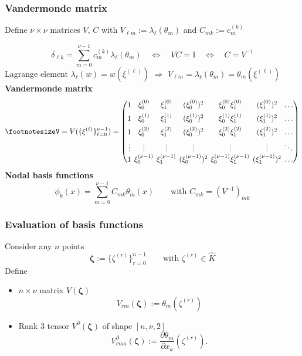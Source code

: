 \documentclass{beamer}
\begin{document}

\begin{frame}
\frametitle{Vandermonde matrix}

Define $\nu\times\nu$ matrices $V$, $C$ with $V_{\ell m} := \lambda_\ell(\theta_m)$ and $C_{mk}:=c_m^{(k)}$

$$
\delta_{\ell k} =  \sum_{m=0}^{\nu-1} c_m^{(k)} \lambda_\ell(\theta_m)
\quad \Leftrightarrow \quad
VC = \mathbb{I}\quad \Leftrightarrow \quad C = V^{-1}
$$
Lagrange element $\lambda_\ell(w) = w(\xi^{(\ell)})$ $\Rightarrow$ $V_{\ell m} = \lambda_{\ell}(\theta_m) = \theta_m(\xi^{(\ell)})$\\[1ex]
\textbf{Vandermonde matrix}
$$
\setlength\arraycolsep{2pt}
{\footnotesize%
V = V(\{\xi^{(\ell)}\}_{\ell=0}^{\nu-1}) = \begin{pmatrix}
1 & \xi^{(0)}_0 & \xi^{(0)}_1  & (\xi^{(0)}_0)^2 & \xi^{(0)}_0 \xi^{(0)}_1 & (\xi^{(0)}_1)^2 & \dots \\[1ex]
1 & \xi^{(1)}_0 & \xi^{(1)}_1 & (\xi^{(1)}_0)^2 & \xi^{(1)}_0 \xi^{(1)}_1 & (\xi^{(1)}_1)^2 & \dots \\[1ex]
1 & \xi^{(2)}_0 & \xi^{(2)}_1 & (\xi^{(2)}_0)^2 & \xi^{(2)}_0 \xi^{(2)}_1 & (\xi^{(2)}_1)^2 & \dots \\[1ex]
\vdots & \vdots & \vdots & \vdots & \vdots & \vdots & \ddots\\
1 & \xi^{(\nu-1)}_0 & \xi^{(\nu-1)}_1 & (\xi^{(\nu-1)}_0)^2 & \xi^{(\nu-1)}_0 \xi^{(\nu-1)}_1 & (\xi^{(\nu-1)}_1)^2 & \dots
\end{pmatrix}}
$$
\textbf{Nodal basis functions}
$$
\phi_k(x) = \sum_{m=0}^{\nu-1} C_{mk} \theta_m(x)\qquad\text{with $C_{mk} = (V^{-1})_{mk}$}
$$
\end{frame}


\begin{frame}
\frametitle{Evaluation of basis functions}
Consider any $n$ points
$$
\boldsymbol{\zeta}:=\{\zeta^{(r)}\}_{r=0}^{n-1}\qquad\text{with $\zeta^{(r)}\in\widehat{K}$}
$$
Define
\begin{itemize}
\item $n\times\nu$ matrix $V(\boldsymbol{\zeta})$
$$
V_{rm}(\boldsymbol{\zeta}) := \theta_m(\zeta^{(r)})
$$
\item Rank 3 tensor $V^{\partial}(\boldsymbol{\zeta})$ of shape $[n,\nu,2]$
$$
V^{\partial}_{rma}(\boldsymbol{\zeta}):=\frac{\partial \theta_m}{\partial x_a}(\zeta^{(r)}).
$$
\end{itemize}
\end{frame}
\end{document}
